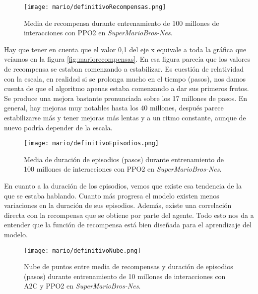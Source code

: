 \documentclass[11pt,fleqn]{book} %
\begin{document}
\begin{figure}[H]
	\centering\texttt{[image: mario/definitivoRecompensas.png]}
	\caption{Media de recompensa durante entrenamiento de 100 millones de interacciones con PPO2 en \textit{SuperMarioBros-Nes}.}
	\label{fig:marioPPO22recompensas} %
\end{figure}

Hay que tener en cuenta que el valor 0,1 del eje x equivale a toda la gráfica que veíamos en la figura \ref{fig:mariorecompensas}. En esa figura parecía que los valores de recompensa se estaban comenzando a estabilizar. Es cuestión de relatividad con la escala, en realidad si se prolonga mucho en el tiempo (pasos), nos damos cuenta de que el algoritmo apenas estaba comenzando a dar sus primeros frutos. \\

Se produce una mejora bastante pronunciada sobre los 17 millones de pasos. En general, hay mejoras muy notables hasta los 40 millones, después parece estabilizarse más y tener mejoras más lentas y a un ritmo constante, aunque de nuevo podría depender de la escala. \\

\begin{figure}[H]
	\centering\texttt{[image: mario/definitivoEpisodios.png]}
	\caption{Media de duración de episodios (pasos) durante entrenamiento de 100 millones de interacciones con PPO2 en \textit{SuperMarioBros-Nes}.}
	\label{fig:marioPPO22episodios} %
\end{figure}

En cuanto a la duración de los episodios, vemos que existe esa tendencia de la que se estaba hablando. Cuanto más progresa el modelo existen menos variaciones en la duración de sus episodios. Además, existe una correlación directa con la recompensa que se obtiene por parte del agente. Todo esto nos da a entender que la función de recompensa está bien diseñada para el aprendizaje del modelo. \\

\begin{figure}[H]
	\centering\texttt{[image: mario/definitivoNube.png]}
	\caption{Nube de puntos entre media de recompensas y duración de episodios (pasos) durante entrenamiento de 10 millones de interacciones con A2C y PPO2 en \textit{SuperMarioBros-Nes}.}
	\label{fig:marioPPO22nube} %
\end{figure}
\end{document}
